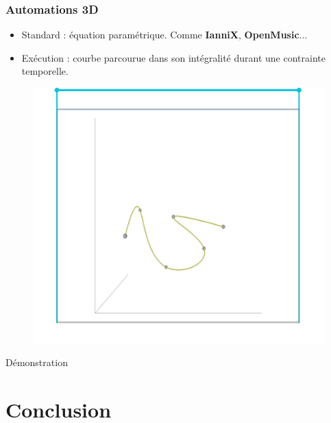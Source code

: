 \documentclass{beamer}
\begin{document}
\begin{frame}
    \frametitle{Automations 3D}\Large
    \begin{itemize}
        \item Standard : équation paramétrique. Comme \textbf{IanniX}, \textbf{OpenMusic}...
        \item Exécution : courbe parcourue dans son intégralité durant une contrainte temporelle.
    \end{itemize}
    \begin{figure}
        \centering
        \includegraphics[scale=0.5]{images/autom3d.png}
    \end{figure}
\end{frame}

\begin{frame}
    \centering\huge
    Démonstration
\end{frame}

\section{Conclusion}
\end{document}
